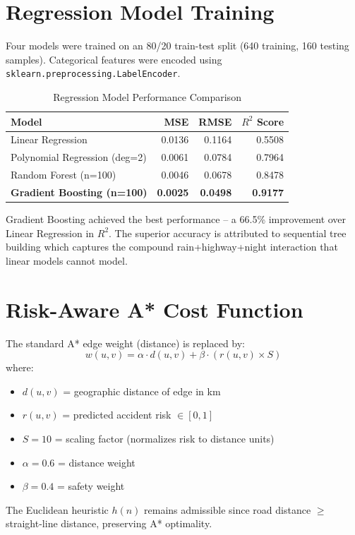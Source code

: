 \documentclass[12pt,a4paper]{report}
\begin{document}
\section{Regression Model Training}
Four models were trained on an 80/20 train-test split (640 training, 160 testing samples). Categorical features were encoded using \texttt{sklearn.preprocessing.LabelEncoder}.

\begin{table}[h!]
\centering
\caption{Regression Model Performance Comparison}
\begin{tabular}{lrrr}
\toprule
\textbf{Model} & \textbf{MSE} & \textbf{RMSE} & \textbf{$R^2$ Score} \\
\midrule
Linear Regression & 0.0136 & 0.1164 & 0.5508 \\
Polynomial Regression (deg=2) & 0.0061 & 0.0784 & 0.7964 \\
Random Forest (n=100) & 0.0046 & 0.0678 & 0.8478 \\
\textbf{Gradient Boosting (n=100)} & \textbf{0.0025} & \textbf{0.0498} & \textbf{0.9177} \\
\bottomrule
\end{tabular}
\end{table}

Gradient Boosting achieved the best performance -- a 66.5\% improvement over Linear Regression in $R^2$. The superior accuracy is attributed to sequential tree building which captures the compound rain+highway+night interaction that linear models cannot model.

\section{Risk-Aware A* Cost Function}
The standard A* edge weight (distance) is replaced by:
\begin{equation}
w(u,v) = \alpha \cdot d(u,v) + \beta \cdot (r(u,v) \times S)
\end{equation}
where:
\begin{itemize}
  \item $d(u,v)$ = geographic distance of edge in km
  \item $r(u,v)$ = predicted accident risk $\in [0,1]$
  \item $S = 10$ = scaling factor (normalizes risk to distance units)
  \item $\alpha = 0.6$ = distance weight
  \item $\beta = 0.4$ = safety weight
\end{itemize}
The Euclidean heuristic $h(n)$ remains admissible since road distance $\geq$ straight-line distance, preserving A* optimality.
\end{document}
